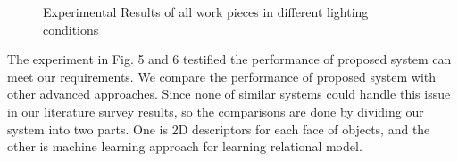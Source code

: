 \documentclass[journal]{IEEEtran}
\begin{document}
\begin{figure}[!t]
\centering


\caption{Experimental Results of all work pieces in different lighting conditions}

\end{figure}

The experiment in Fig. 5 and 6 testified the performance of proposed system can meet our requirements. We compare the performance of proposed system with other advanced approaches. Since none of similar systems could handle this issue in our literature survey results, so the comparisons are done by dividing our system into two parts. One is 2D descriptors for each face of objects, and the other is machine learning approach for learning relational model.
\end{document}
